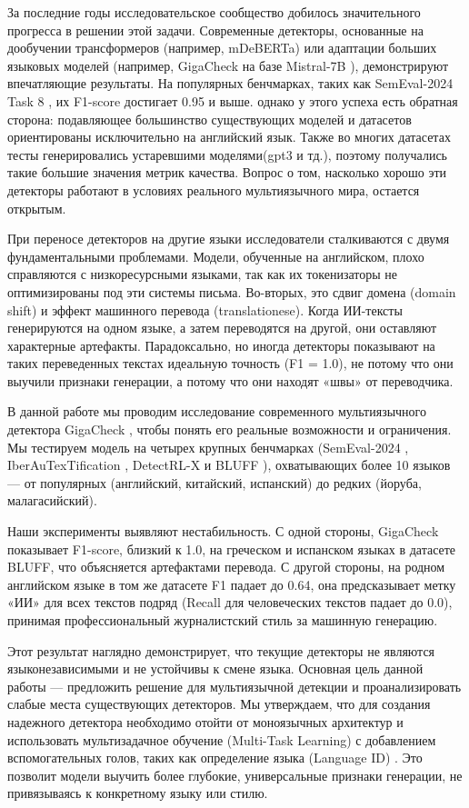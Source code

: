 \documentclass{article}
\begin{document}
За последние годы исследовательское сообщество добилось значительного прогресса в решении этой задачи. Современные детекторы, основанные на дообучении трансформеров (например, mDeBERTa) или адаптации больших языковых моделей (например, GigaCheck на базе Mistral-7B \cite{gigacheck2026}), демонстрируют впечатляющие результаты. На популярных бенчмарках, таких как SemEval-2024 Task 8 \cite{semeval2024}, их F1-score достигает 0.95 и выше. однако у этого успеха есть обратная сторона: подавляющее большинство существующих моделей и датасетов ориентированы исключительно на английский язык. Также во многих датасетах тесты генерировались устаревшими моделями(gpt3 и тд.), поэтому получались такие большие значения метрик качества. Вопрос о том, насколько хорошо эти детекторы работают в условиях реального мультиязычного мира, остается открытым.

При переносе детекторов на другие языки исследователи сталкиваются с двумя фундаментальными проблемами. Модели, обученные на английском, плохо справляются с низкоресурсными языками, так как их токенизаторы не оптимизированы под эти системы письма. Во-вторых, это сдвиг домена (domain shift) и эффект машинного перевода (translationese). Когда ИИ-тексты генерируются на одном языке, а затем переводятся на другой, они оставляют характерные артефакты. Парадоксально, но иногда детекторы показывают на таких переведенных текстах идеальную точность (F1 = 1.0), не потому что они выучили признаки генерации, а потому что они находят «швы» от переводчика.

В данной работе мы проводим исследование современного мультиязычного детектора GigaCheck \cite{gigacheck2026}, чтобы понять его реальные возможности и ограничения. Мы тестируем модель на четырех крупных бенчмарках (SemEval-2024 \cite{semeval2024}, IberAuTexTification \cite{iberautext2024}, DetectRL-X \cite{detectrlx2026} и BLUFF \cite{bluff2026}), охватывающих более 10 языков — от популярных (английский, китайский, испанский) до редких (йоруба, малагасийский).

Наши эксперименты выявляют нестабильность. С одной стороны, GigaCheck показывает F1-score, близкий к 1.0, на греческом и испанском языках в датасете BLUFF, что объясняется артефактами перевода. С другой стороны, на родном английском языке в том же датасете F1 падает до 0.64, она предсказывает метку «ИИ» для всех текстов подряд (Recall для человеческих текстов падает до 0.0), принимая профессиональный журналистский стиль за машинную генерацию.

Этот результат наглядно демонстрирует, что текущие детекторы не являются языконезависимыми и не устойчивы к смене языка. Основная цель данной работы — предложить решение для мультиязычной детекции и проанализировать слабые места существующих детекторов. Мы утверждаем, что для создания надежного детектора необходимо отойти от моноязычных архитектур и использовать мультизадачное обучение (Multi-Task Learning) с добавлением вспомогательных голов, таких как определение языка (Language ID) \cite{advacheck2024, gigacheck_span2024}. Это позволит модели выучить более глубокие, универсальные признаки генерации, не привязываясь к конкретному языку или стилю.
\end{document}

